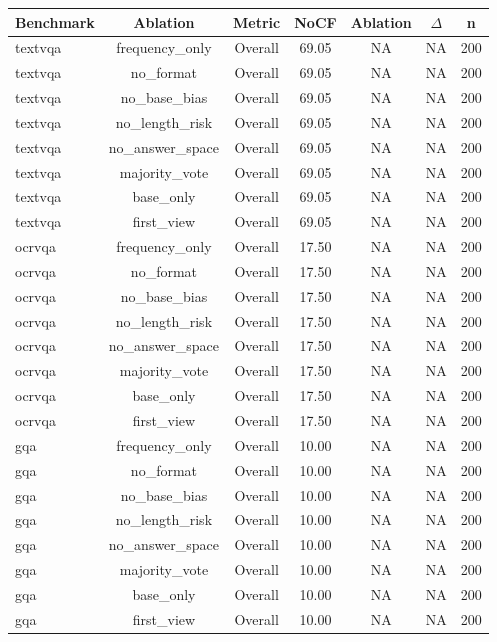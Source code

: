 \begin{table}[t]
\centering
\begin{tabular}{lcccccc}
\toprule
Benchmark & Ablation & Metric & NoCF & Ablation & $\Delta$ & n \\
\midrule
textvqa & frequency_only & Overall & 69.05 & NA & NA & 200 \\
textvqa & no_format & Overall & 69.05 & NA & NA & 200 \\
textvqa & no_base_bias & Overall & 69.05 & NA & NA & 200 \\
textvqa & no_length_risk & Overall & 69.05 & NA & NA & 200 \\
textvqa & no_answer_space & Overall & 69.05 & NA & NA & 200 \\
textvqa & majority_vote & Overall & 69.05 & NA & NA & 200 \\
textvqa & base_only & Overall & 69.05 & NA & NA & 200 \\
textvqa & first_view & Overall & 69.05 & NA & NA & 200 \\
ocrvqa & frequency_only & Overall & 17.50 & NA & NA & 200 \\
ocrvqa & no_format & Overall & 17.50 & NA & NA & 200 \\
ocrvqa & no_base_bias & Overall & 17.50 & NA & NA & 200 \\
ocrvqa & no_length_risk & Overall & 17.50 & NA & NA & 200 \\
ocrvqa & no_answer_space & Overall & 17.50 & NA & NA & 200 \\
ocrvqa & majority_vote & Overall & 17.50 & NA & NA & 200 \\
ocrvqa & base_only & Overall & 17.50 & NA & NA & 200 \\
ocrvqa & first_view & Overall & 17.50 & NA & NA & 200 \\
gqa & frequency_only & Overall & 10.00 & NA & NA & 200 \\
gqa & no_format & Overall & 10.00 & NA & NA & 200 \\
gqa & no_base_bias & Overall & 10.00 & NA & NA & 200 \\
gqa & no_length_risk & Overall & 10.00 & NA & NA & 200 \\
gqa & no_answer_space & Overall & 10.00 & NA & NA & 200 \\
gqa & majority_vote & Overall & 10.00 & NA & NA & 200 \\
gqa & base_only & Overall & 10.00 & NA & NA & 200 \\
gqa & first_view & Overall & 10.00 & NA & NA & 200 \\

\end{tabular}
\end{table}
